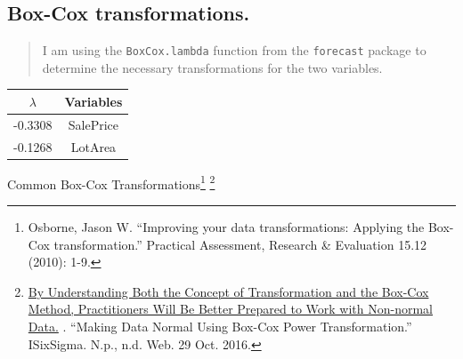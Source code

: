 \documentclass[]{article}
\newenvironment{Shaded}{\begin{snugshade}}{\end{snugshade}}
\newcommand{\KeywordTok}[1]{\textcolor[rgb]{0.13,0.29,0.53}{\textbf{{#1}}}}
\newcommand{\DataTypeTok}[1]{\textcolor[rgb]{0.13,0.29,0.53}{{#1}}}
\newcommand{\DecValTok}[1]{\textcolor[rgb]{0.00,0.00,0.81}{{#1}}}
\newcommand{\CharTok}[1]{\textcolor[rgb]{0.31,0.60,0.02}{{#1}}}
\newcommand{\StringTok}[1]{\textcolor[rgb]{0.31,0.60,0.02}{{#1}}}
\newcommand{\NormalTok}[1]{{#1}}
\let\rmarkdownfootnote\footnote%
\def\footnote{\protect\rmarkdownfootnote}
\begin{document}
\newpage

\subsection{Box-Cox transformations.}\label{box-cox-transformations.}

\begin{quote}
I am using the \texttt{BoxCox.lambda} function from the
\texttt{forecast} package to determine the necessary transformations for
the two variables.
\end{quote}

\begin{Shaded}
\end{Shaded}

\begin{longtable}[]{@{}cc@{}}
\toprule
\(\lambda\) & Variables\tabularnewline
\midrule
\endhead
-0.3308 & SalePrice\tabularnewline
-0.1268 & LotArea\tabularnewline
\bottomrule
\end{longtable}

\centering

Common Box-Cox Transformations\footnote{Osborne, Jason W. ``Improving
  your data transformations: Applying the Box-Cox transformation.''
  Practical Assessment, Research \& Evaluation 15.12 (2010): 1-9.}
\footnote{\href{https://www.isixsigma.com/tools-templates/normality/making-data-normal-using-box-cox-power-transformation/}{By
  Understanding Both the Concept of Transformation and the Box-Cox
  Method, Practitioners Will Be Better Prepared to Work with Non-normal
  Data.} . ``Making Data Normal Using Box-Cox Power Transformation.''
  ISixSigma. N.p., n.d. Web. 29 Oct. 2016.}
\end{document}
